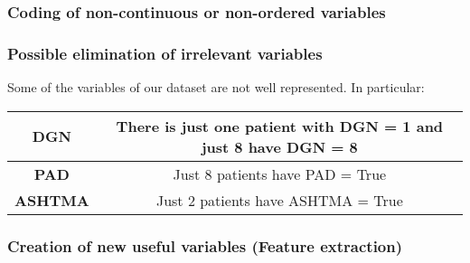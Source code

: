 \subsubsection{Coding of non-continuous or non-ordered variables}
\subsubsection{Possible elimination of irrelevant variables}

Some of the variables of our dataset are not well represented. In particular:

\begin{center}
\begin{tabular}{|c|c|}
  \hline
  \textbf{DGN} & There is just one patient with DGN = 1 and just 8 have DGN = 8 \\
  \hline
  \textbf{PAD} & Just 8 patients have PAD = True \\
  \hline
  \textbf{ASHTMA} & Just 2 patients have ASHTMA = True \\
  \hline
\end{tabular}
\end{center}


%
\subsubsection{Creation of new useful variables (Feature extraction)}
